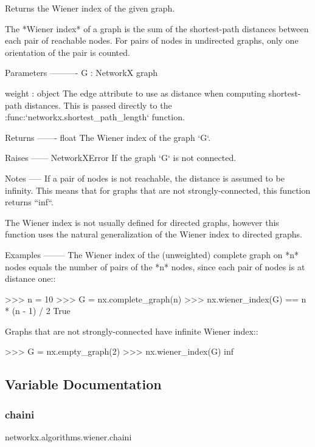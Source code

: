 \begin{DoxyVerb}Returns the Wiener index of the given graph.

The *Wiener index* of a graph is the sum of the shortest-path
distances between each pair of reachable nodes. For pairs of nodes
in undirected graphs, only one orientation of the pair is counted.

Parameters
----------
G : NetworkX graph

weight : object
    The edge attribute to use as distance when computing
    shortest-path distances. This is passed directly to the
    :func:`networkx.shortest_path_length` function.

Returns
-------
float
    The Wiener index of the graph `G`.

Raises
------
NetworkXError
    If the graph `G` is not connected.

Notes
-----
If a pair of nodes is not reachable, the distance is assumed to be
infinity. This means that for graphs that are not
strongly-connected, this function returns ``inf``.

The Wiener index is not usually defined for directed graphs, however
this function uses the natural generalization of the Wiener index to
directed graphs.

Examples
--------
The Wiener index of the (unweighted) complete graph on *n* nodes
equals the number of pairs of the *n* nodes, since each pair of
nodes is at distance one::

    >>> n = 10
    >>> G = nx.complete_graph(n)
    >>> nx.wiener_index(G) == n * (n - 1) / 2
    True

Graphs that are not strongly-connected have infinite Wiener index::

    >>> G = nx.empty_graph(2)
    >>> nx.wiener_index(G)
    inf\end{DoxyVerb}
 

\subsection{Variable Documentation}
\mbox{\label{namespacenetworkx_1_1algorithms_1_1wiener_a20d91ae0d61b08010a0fbacb6e6f49aa}} 
\subsubsection{\texorpdfstring{chaini}{chaini}}
{\footnotesize\ttfamily networkx.\+algorithms.\+wiener.\+chaini}

